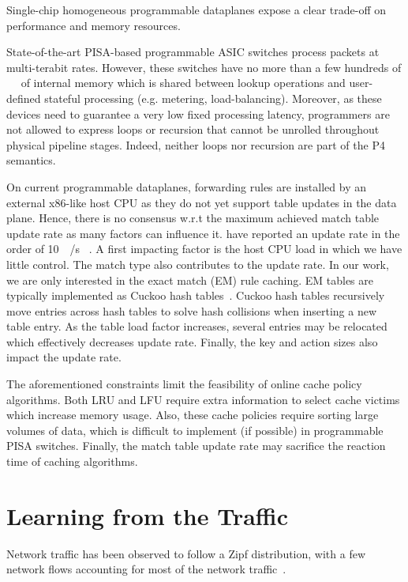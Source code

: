 Single-chip homogeneous programmable dataplanes expose a clear trade-off on performance and memory resources.

State-of-the-art PISA-based programmable ASIC switches process packets at multi-terabit rates.
However, these switches have no more than a few hundreds of \SI{}{\mega\byte} of internal memory which is shared between lookup operations and user-defined stateful processing (e.g. metering, load-balancing).
Moreover, as these devices need to guarantee a very low fixed processing latency, programmers are not allowed to express loops or recursion that cannot be unrolled throughout physical pipeline stages.
Indeed, neither loops nor recursion are part of the P4 semantics.

On current programmable dataplanes, forwarding rules are installed by an external x86-like host CPU as they do not yet support table updates in the data plane.
Hence, there is no consensus w.r.t the maximum achieved match table update rate as many factors can influence it.
\citeauthor{Jin:2017} have reported an update rate in the order of \SI{10}{\kilo\update/\second}
~\cite{Jin:2017}.
A first impacting factor is the host CPU load in which we have little control.
The match type also contributes to the update rate.
In our work, we are only interested in the exact match (EM) rule caching. 
EM tables are typically implemented as Cuckoo hash tables~\cite{Kirsch:2009,Bosshart:14}.
Cuckoo hash tables recursively move entries across hash tables to solve hash collisions when inserting a new table entry.
As the table load factor increases, several entries may be relocated which effectively decreases update rate.
Finally, the key and action sizes also impact the update rate.

The aforementioned constraints limit the feasibility of online cache policy algorithms.
Both LRU and LFU require extra information to select cache victims which increase memory usage.
Also, these cache policies require sorting large volumes of data, which is difficult to implement (if possible) in programmable PISA switches.
Finally, the match table update rate may sacrifice the reaction time of caching algorithms.

\section{Learning from the Traffic}\label{sec:traffic}

Network traffic has been observed to follow a Zipf distribution, with a few network flows accounting for most of the network traffic~\cite{Sarrar:2012, Jin:2017}.

